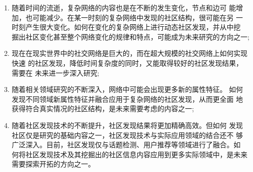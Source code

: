 \begin{conclusion}
\begin{enumerate}
    \item 随着时间的流逝，复杂网络的内容也是在不断的发生变化，节点和边可
    能增加，也可能减少。在某一时刻的复杂网络中发现的社区结构，很可能在另
    一时刻产生很大变化。如何在变化的复杂网络上进行动态社区发现，并从中挖
    掘出社区变化甚至整个网络变化的规律和特点，可能成为未来研究的方向之一;
    \item 现在在现实世界中的社交网络是巨大的，而在超大规模的社交网络上如何实现快速
    的社区发现，降低时间复杂度的同时，又能取得较好的社区发现结果，需要在
    未来进一步深入研究;
    \item 随着相关领域研究的不断深入，网络中可能会出现更多新的属性特征。
    如何发现不同领域新属性特征并融合应用于复杂网络的社区发现，从而更全面
    地获得符合真实情况的社区结构，是未来需要考虑的内容之一;
    \item 随着社区发现技术的不断提升，社区发现结果将更加精确高效。但如何
    发现社区仅是研究的基础内容之一，社区发现技术与实际应用领域的结合还不
    够广泛深入。目前，社区发现仅与话题检测、用户推荐等领域进行了融合。如
    何将社区发现技术及其挖掘出的社区信息内容应用到更多实际领域中，是未来
    需要探索开拓的方向之一。
\end{enumerate}

\end{conclusion}